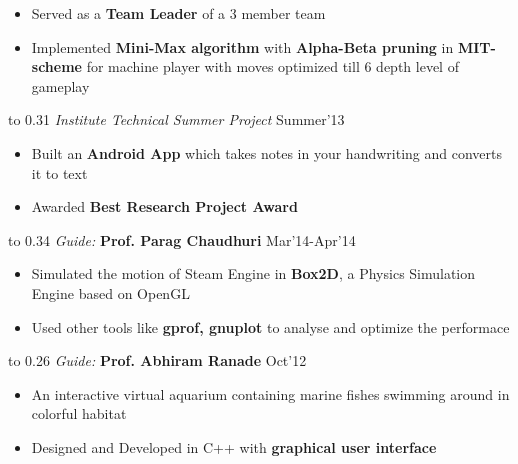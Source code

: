 \documentclass[11pt]{book} %
\begin{document}
\vspace{-3mm}
\begin{itemize}
\itemsep-0.3em
\item Served as a \textbf{Team Leader} of a 3 member team
\item Implemented \textbf{Mini-Max algorithm} with \textbf{Alpha-Beta pruning} in \textbf{MIT-scheme} for machine player with 
moves optimized till 6 depth level of gameplay
\end{itemize}
\vspace{-1mm}

\noindent\hbox to 0.31 \hfill \textit{Institute Technical Summer Project} \hfill Summer'13
\vspace{-3mm}
\begin{itemize}
\itemsep-0.3em
\item Built an \textbf{Android App} which takes notes in your handwriting and converts it to text
\item Awarded \textbf{Best Research Project Award}
\end{itemize}
\vspace{-1mm}

\noindent\hbox to 0.34 \hfill \textit{Guide:} \textbf{Prof. Parag Chaudhuri} \hfill Mar'14-Apr'14
\vspace{-3mm}
\begin{itemize}
\itemsep-0.3em
\item Simulated the motion of Steam Engine in \textbf{Box2D}, a Physics Simulation Engine based on OpenGL
\item Used other tools like \textbf{gprof, gnuplot} to analyse and optimize the performace
\end{itemize}
\vspace{-1mm}

\noindent\hbox to 0.26 \hfill \textit{Guide:} \textbf{Prof. Abhiram Ranade} \hfill Oct'12

\vspace{-2mm}
\begin{itemize}
\itemsep-0.1em
\item An interactive virtual aquarium containing marine fishes swimming around in colorful habitat
\item Designed and Developed in C++ with \textbf{graphical user interface}
\end{itemize}
\vspace{-8mm}
\end{document}
